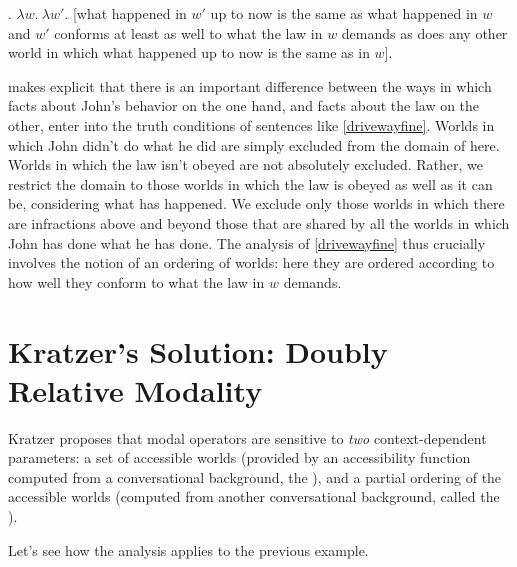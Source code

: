 \ex. $\lambda w.\ \lambda w'.$ [what happened in $w'$ up to now is the same as what happened in $w$ and $w'$ conforms at least as well to what the law in $w$ demands as does any other world in which what happened up to now is the same as in $w$].

\Last makes explicit that there is an important difference between the ways in which facts about John's behavior on the one hand, and facts about the law on the other, enter into the truth conditions of sentences like \ref{drivewayfine}. Worlds in which John didn't do what he did are simply excluded from the domain of  here. Worlds in which the law isn't obeyed are not absolutely excluded. Rather, we restrict the domain to those worlds in which the law is obeyed as well as it can be, considering what has happened. We exclude only those worlds in which there are infractions above and beyond those that are shared by all the worlds in which John has done what he has done. The analysis of \ref{drivewayfine} thus crucially involves the notion of an ordering of worlds: here they are ordered according to how well they conform to what the law in $w$ demands.

\section{Kratzer's Solution: Doubly Relative Modality}

Kratzer proposes that modal operators are sensitive to \emph{two} context-dependent parameters: a set of accessible worlds (provided by an accessibility function computed from a conversational background, the ), and a partial ordering of the accessible worlds (computed from another conversational background, called the ).

Let's see how the analysis applies to the previous example.

